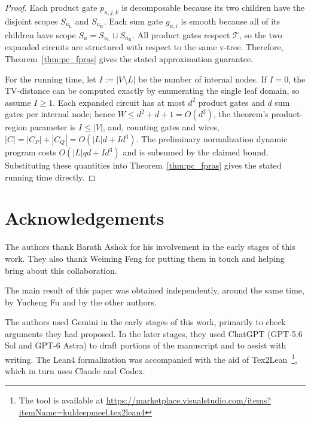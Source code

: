 \documentclass{article}
\newcommand{\ignore}[1]{}
\begin{document}
\begin{proof}
Each product gate $p_{u,j,k}$ is decomposable because its two children have the disjoint scopes $S_{u_{\mathrm L}}$ and $S_{u_{\mathrm R}}$. Each sum gate $g_{u,i}$ is smooth because all of its children have scope $S_u=S_{u_{\mathrm L}}\sqcup S_{u_{\mathrm R}}$. All product gates respect $\mathcal T$, so the two expanded circuits are structured with respect to the same v-tree. Therefore, Theorem~\ref{thm:pc_fpras} gives the stated approximation guarantee.

For the running time, let $I:=|V\setminus L|$ be the number of internal nodes. If $I=0$, the TV-distance can be computed exactly by enumerating the single leaf domain, so assume $I\geq1$. Each expanded circuit has at most $d^2$ product gates and $d$ sum gates per internal node; hence $W\leq d^2+d+1=O(d^2)$, the theorem's product-region parameter is $I\leq|V|$, and, counting gates and wires, $|C|=|C_P|+|C_Q|=O(|L|d+Id^3)$. The preliminary normalization dynamic program costs $O(|L|qd+Id^3)$ and is subsumed by the claimed bound. Substituting these quantities into Theorem~\ref{thm:pc_fpras} gives the stated running time directly.
\end{proof}

\section*{Acknowledgements}
The authors thank Barath Ashok for his involvement in the early stages of this work. They also thank Weiming Feng for putting them in touch and helping bring about this collaboration. 

The main result of this paper was obtained independently, around the same time, by Yucheng Fu and by the other authors. 
\ignore{After completing his work on zonotope compression~\cite{Fu26}, Fu obtained the result following a suggestion from GPT-5.6 Pro. When Arnab Bhattacharyya informed Weiming Feng of the other authors' result, Feng pointed out that Fu had also obtained it and introduced the authors by email. The authors then agreed to present their results jointly in this paper.}
The authors used Gemini in the early stages of this work, primarily to check arguments they had proposed. In the later stages, they used ChatGPT (GPT-5.6 Sol and GPT-6 Astra) to draft portions of the manuscript and to assist with writing. The Lean4 formalization was accompanied with the aid of Tex2Lean~\footnote{The tool is available at \url{https://marketplace.visualstudio.com/items?itemName=kuldeepmeel.tex2lean4}}, which in turn uses Claude and Codex.





\end{document}
